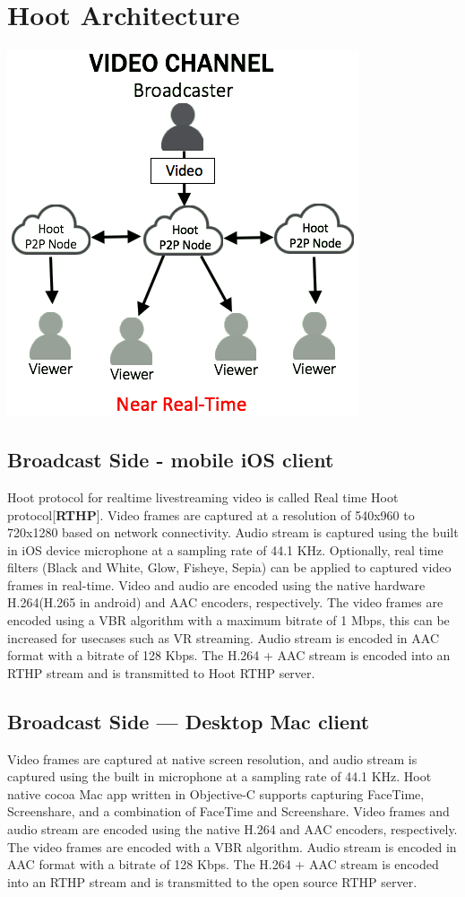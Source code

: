 \section{Hoot Architecture}

\includegraphics[scale=0.5]{static/hoot-video-architecture-channel-trans}

\subsection{Broadcast Side - mobile iOS client}
Hoot protocol for realtime livestreaming video is called Real time Hoot protocol[\textbf{RTHP}].
Video frames are captured at a resolution of 540x960 to 720x1280 based on network connectivity. Audio stream is captured using the built in iOS device microphone at a sampling rate of 44.1 KHz. Optionally, real time filters (Black and White, Glow, Fisheye, Sepia) can be applied to captured video frames in real-time. Video and audio are encoded using the native hardware H.264(H.265 in android) and AAC encoders, respectively. The video frames are encoded using a VBR algorithm with a maximum bitrate of 1 Mbps, this can be increased for usecases such as VR streaming. Audio stream is encoded in AAC format with a bitrate of 128 Kbps. The H.264 + AAC stream is encoded into an RTHP stream and is transmitted to Hoot RTHP server.

\subsection{Broadcast Side — Desktop Mac client}
Video frames are captured at native screen resolution, and audio stream is captured using the built in microphone at a sampling rate of 44.1 KHz. Hoot native cocoa Mac app written in Objective-C supports capturing FaceTime, Screenshare, and a combination of FaceTime and Screenshare. Video frames and audio stream are encoded using the native H.264 and AAC encoders, respectively. The video frames are encoded with a VBR algorithm. Audio stream is encoded in AAC format with a bitrate of 128 Kbps. The H.264 + AAC stream is encoded into an RTHP stream and is transmitted to the open source RTHP server.

